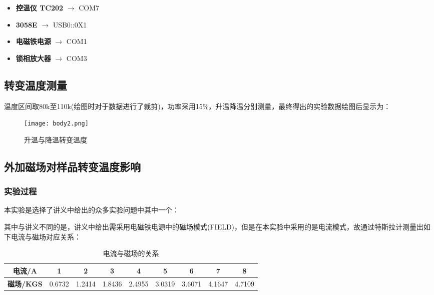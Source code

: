 \begin{itemize}
	\item \textbf{控温仪 TC202}  $\rightarrow$ COM7
	\item \textbf{3058E} $\rightarrow$ USB0::0X1
	\item \textbf{电磁铁电源} $\rightarrow$ COM1
	\item \textbf{锁相放大器} $\rightarrow$ COM3
\end{itemize}



\subsection{转变温度测量}
温度区间取80k至110k(绘图时对于数据进行了裁剪)，功率采用15\%，升温降温分别测量，最终得出的实验数据绘图后显示为：
\begin{figure}[{H}]
	\centering
	\texttt{[image: body2.png]}
	\caption{升温与降温转变温度}
	\label{}
\end{figure}

\subsection{外加磁场对样品转变温度影响}
\subsubsection{实验过程}
本实验是选择了讲义中给出的众多实验问题中其中一个：



其中与讲义不同的是，讲义中给出需采用电磁铁电源中的磁场模式(FIELD)，但是在本实验中采用的是电流模式，故通过特斯拉计测量出如下电流与磁场对应关系：

\begin{table}[h!]
	\centering
	\renewcommand{\arraystretch}{1.5} %
	\caption{电流与磁场的关系}
	\label{tab:current_magnetic_field}
	\begin{tabular}{|c|c|c|c|c|c|c|c|c|}
		\hline
		\textbf{电流/A} & 1 & 2 & 3 & 4 & 5 & 6 & 7 & 8\\ \hline
		\textbf{磁场/KGS} & 0.6732 & 1.2414 & 1.8436 & 2.4955 & 3.0319 & 3.6071 & 4.1647 & 4.7109\\ \hline
	\end{tabular}
\end{table}


